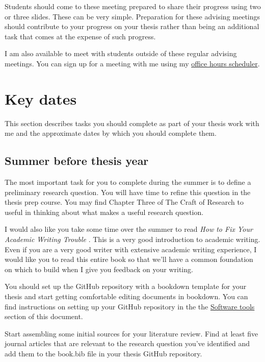 \documentclass[]{tufte-book}
\begin{document}
Students should come to these meeting prepared to share their progress using two or three slides. These can be very simple. Preparation for these advising meetings should contribute to your progress on your thesis rather than being an additional task that comes at the expense of such progress.

I am also available to meet with students outside of these regular advising meetings. You can sign up for a meeting with me using my \href{https://carole-voulgaris.youcanbook.me/}{office hours scheduler}.

\hypertarget{key-dates}{%
\chapter{Key dates}\label{key-dates}}

This section describes tasks you should complete as part of your thesis work with me and the approximate dates by which you should complete them.

\hypertarget{summer-before-thesis-year}{%
\section{Summer before thesis year}\label{summer-before-thesis-year}}

The most important task for you to complete during the summer is to define a preliminary research question. You will have time to refine this question in the thesis prep course. You may find Chapter Three of The Craft of Research \citep{booth_chapter_2016} to useful in thinking about what makes a useful research question.

I would also like you take some time over the summer to read \emph{How to Fix Your Academic Writing Trouble} \citep{mewburn2018ebook}. This is a very good introduction to academic writing. Even if you are a very good writer with extensive academic writing experience, I would like you to read this entire book so that we'll have a common foundation on which to build when I give you feedback on your writing.

You should set up the GitHub repository with a bookdown template for your thesis and start getting comfortable editing documents in bookdown. You can find instructions on setting up your GitHub repository in the the \protect\hyperlink{software-tools}{Software tools} section of this document.

Start assembling some initial sources for your literature review. Find at least five journal articles that are relevant to the research question you've identified and add them to the book.bib file in your thesis GitHub repository.
\end{document}
